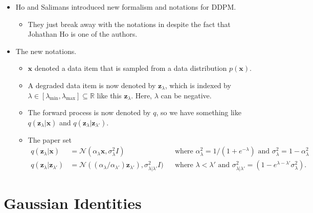 \documentclass[10pt]{article}
\newcommand{\ve}[1]{\mathbf{#1}}
\newcommand{\Real}{\mathbb{R}}
\newcommand{\N}{\mathcal{N}}
\begin{document}
\begin{itemize}
  \item Ho and Salimans introduced new formalism and notations for DDPM.
  \begin{itemize}
    \item They just break away with the notations in \cite{Ho:2020} despite the fact that Johathan Ho is one of the authors.
  \end{itemize}

  \item The new notations.
  \begin{itemize}
    \item $\ve{x}$ denoted a data item that is sampled from a data distribution $p(\ve{x})$.
  
    \item A degraded data item is now denoted by $\ve{z}_\lambda$, which is indexed by $\lambda \in [\lambda_{\min}, \lambda_{\max}] \subseteq \Real$ like this $\ve{z}_\lambda$. Here, $\lambda$ can be negative.
    
    \item The forward process is now denoted by $q$, so we have something like $q(\ve{z}_\lambda | \ve{x})$ and $q(\ve{z}_{\lambda} | \ve{z}_{\lambda'})$.

    \item The paper set
    \begin{align*}
      q(\ve{z}_\lambda | \ve{x}) &= \N(\alpha_\lambda \ve{x}, \sigma_\lambda^2 I)      
      &&\mbox{where }\alpha_\lambda^2 = 1/(1 + e^{-\lambda})\mbox{ and }\sigma_\lambda^2 = 1 - \alpha_\lambda^2 \\
      q(\ve{z}_{\lambda}|\ve{z}_{\lambda'}) &= \N((\alpha_\lambda/\alpha_{\lambda'})\ve{z}_{\lambda'}), \sigma^2_{\lambda|\lambda'} I)
      &&\mbox{where }\lambda < \lambda'\mbox{ and }\sigma^2_{\lambda|\lambda'} = (1 - e^{\lambda - \lambda'} \sigma^2_{\lambda}).
    \end{align*}    
  \end{itemize}

  
\end{itemize}

\appendix

\section{Gaussian Identities}
\end{document}
